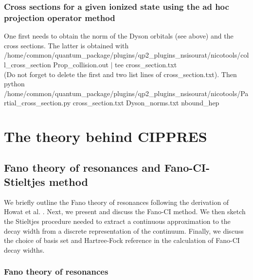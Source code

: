 \documentclass[a4paper, 10 pt]{report}
\begin{document}
\subsection{Cross sections for a given ionized state using the ad hoc projection operator method}

One first needs to obtain the norm of the Dyson orbitals (see above) and the cross sections. The latter is obtained with \\
/home/common/quantum\_package/plugins/qp2\_plugins\_nsisourat/nicotools/coll\_cross\_section Prop\_collision.out $|$ tee  cross\_section.txt\\
(Do not forget to delete the first and two list lines of cross\_section.txt). Then\\
python /home/common/quantum\_package/plugins/qp2\_plugins\_nsisourat/nicotools/Partial\_cross\_section.py cross\_section.txt Dyson\_norms.txt nbound\_hep \\

\newpage

\chapter{The theory behind CIPPRES}

\section{Fano theory of resonances and Fano-CI-Stieltjes method}

We briefly outline the Fano theory of resonances following the 
derivation of Howat et al. \cite{Howat78:1575}. Next, we present and discuss 
the Fano-CI method. We then sketch the Stieltjes procedure needed to extract a 
continuous approximation to the decay width from a discrete representation of 
the continuum. Finally, we discuss the choice of basis set and Hartree-Fock 
reference in the calculation of Fano-CI decay widths.

\subsection{Fano theory of resonances}
\end{document}
